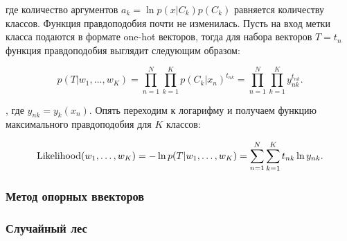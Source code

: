 где количество аргументов $a_k = \ln p(x|C_k)p(C_k)$ равняется количеству классов. Функция правдоподобия почти
не изменилась. Пусть на вход метки класса подаются в формате one-hot векторов, тогда для набора векторов $T =
{t_n}$ функция правдоподобия выглядит следующим образом:

\begin{equation}
 p(T|w_1,\ldots,w_K) = \prod_{n=1}^N \prod_{k=1}^K p(C_k|x_n)^{t_{nk}} = \prod_{n=1}^N \prod_{k=1}^K
y_{nk}^{t_{nk}}.
\end{equation}

, где $y_{nk} = y_k(x_n)$. Опять переходим к логарифму и получаем функцию максимального правдоподобия для $K$
классов:

\begin{equation}
 \operatorname*{Likelihood} (w_1,\ldots,w_K) = -\ln p(T|w_1,\ldots,w_K) = \sum_{n=1}^N \sum_{k=1}^K t_{nk}\ln y_{nk}.
\end{equation}


\subsubsection{Метод опорных ввекторов}
















\subsubsection{Случайный лес}
























